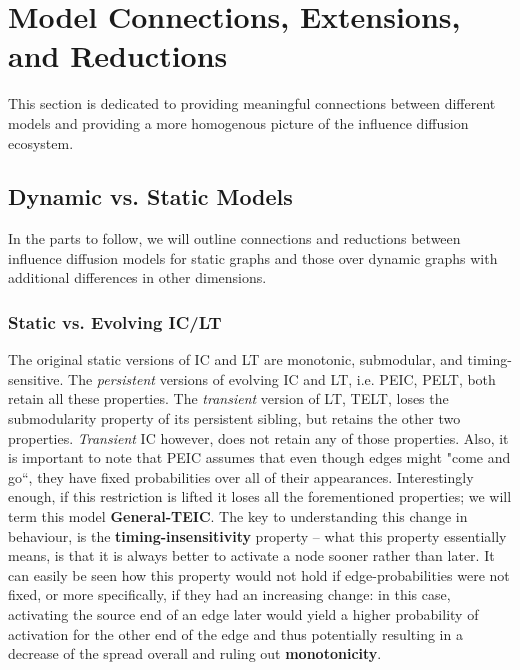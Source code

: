 \documentclass[twocolumn, 10pt]{article}
\begin{document}
\section{Model Connections, Extensions, and Reductions}
This section is dedicated to providing meaningful connections between different models and providing a more homogenous picture of the influence diffusion ecosystem. 
\subsection{Dynamic vs. Static Models}
In the parts to follow, we will outline connections and reductions between influence diffusion models for static graphs and those over dynamic graphs with additional differences in other dimensions. 
\subsubsection{Static vs. Evolving IC/LT}
The original static versions of IC and LT are monotonic, submodular, and timing-sensitive. The \textit{persistent} versions of evolving IC and LT, i.e. PEIC, PELT, both retain all these properties. The \textit{transient} version of LT, TELT, loses the submodularity property of its persistent sibling, but retains the other two properties. \textit{Transient} IC however, does not retain any of those properties. Also, it is important to note that PEIC assumes that even though edges might "come and go``, they have fixed probabilities over all of their appearances. Interestingly enough, if this restriction is lifted it loses all the forementioned properties; we will term this model \textbf{General-TEIC}. 
The key to understanding this change in behaviour, is the \textbf{timing-insensitivity} property -- what this property essentially means, is that it is always better to activate a node sooner rather than later. It can easily be seen how this property would not hold if edge-probabilities were not fixed, or more specifically, if they had an increasing change: in this case, activating the source end of an edge later would yield a higher probability of activation for the other end of the edge and thus potentially resulting in a decrease of the spread overall and ruling out \textbf{monotonicity}. \\
\end{document}
